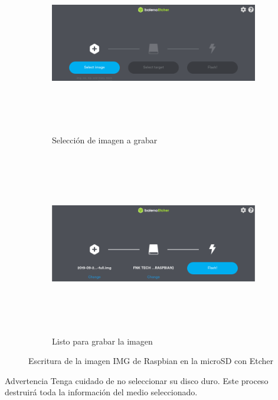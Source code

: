 \documentclass[letterpaper,10.5pt]{article}
\begin{document}
\begin{figure}[H]
	\centering%
	\begin{subfigure}[b]{0.5\linewidth}
		\centering
		\includegraphics[width=0.9\linewidth,height=8cm,keepaspectratio]{img/p01-02-linux-imagea.png} %
		\caption{Selección de imagen a grabar}
		\label{fig:write-image-linux-a} %
	\end{subfigure}%
	\begin{subfigure}[b]{0.5\linewidth}
		\centering
		\includegraphics[width=0.9\linewidth,height=8cm,keepaspectratio]{img/p01-02-linux-imageb.png} %
		\caption{Listo para grabar la imagen}
		\label{fig:write-image-linux-b} %
	\end{subfigure}
	\caption{Escritura de la imagen IMG de Raspbian en la microSD con Etcher}%
	\label{fig:write-image-linux} %
\end{figure}

\begin{importantbox}{Advertencia}
Tenga cuidado de no seleccionar su disco duro.
Este proceso destruirá toda la información del medio seleccionado.
\end{importantbox}
\end{document}
